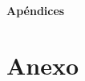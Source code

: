 \documentclass[12pt,twoside,titlepage]{report}
\begin{document}
{}

\mbox{}
\vfill
\begin{center}
\begin{Huge}
\textbf{Apéndices}
\end{Huge}
\end{center}
\vfill
\mbox{}
\thispagestyle{empty}

\mbox{}
\thispagestyle{empty}


\chapter{Anexo}
\label{sec:apendice}



\end{document}

